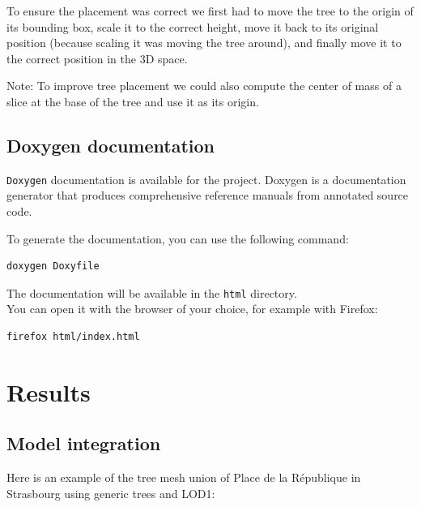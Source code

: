 \documentclass[12pt]{article}
\begin{document}
To ensure the placement was correct we first had to move the tree to the origin
of its bounding box, scale it to the correct height, move it back to its original position
(because scaling it was moving the tree around), and finally move it to the correct position in the 3D space.

Note: To improve tree placement we could also compute the center of mass of a slice
at the base of the tree and use it as its origin.

\subsection{Doxygen documentation}

\texttt{Doxygen}\cite{doxygen} documentation is available for the project. Doxygen is a
documentation generator that produces comprehensive reference manuals from
annotated source code.

To generate the documentation, you can use the following command:

\begin{lstlisting}[language=bash]
doxygen Doxyfile
\end{lstlisting}

The documentation will be available in the \texttt{html} directory.\\
You can open it with the browser of your choice, for example with Firefox:

\begin{lstlisting}[language=bash]
firefox html/index.html
\end{lstlisting}

\newpage

\section{Results}
\label{sec:Results}
\subsection{Model integration}

Here is an example of the tree mesh union of Place de la République in Strasbourg
using generic trees and LOD1:
\end{document}
